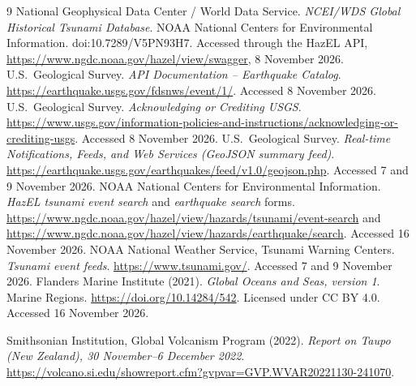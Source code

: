 \documentclass[a4paper,11pt,oneside]{book}
\begin{document}
\begin{thebibliography}{9}
 National Geophysical Data Center / World Data Service. \emph{NCEI/WDS Global Historical Tsunami Database}. NOAA National Centers for Environmental Information. doi:10.7289/V5PN93H7. Accessed through the HazEL API, \url{https://www.ngdc.noaa.gov/hazel/view/swagger}, 8 November 2026.
 U.S.\ Geological Survey. \emph{API Documentation -- Earthquake Catalog}. \url{https://earthquake.usgs.gov/fdsnws/event/1/}. Accessed 8 November 2026.
 U.S.\ Geological Survey. \emph{Acknowledging or Crediting USGS}. \url{https://www.usgs.gov/information-policies-and-instructions/acknowledging-or-crediting-usgs}. Accessed 8 November 2026.
 U.S.\ Geological Survey. \emph{Real-time Notifications, Feeds, and Web Services (GeoJSON summary feed)}. \url{https://earthquake.usgs.gov/earthquakes/feed/v1.0/geojson.php}. Accessed 7 and 9 November 2026.
 NOAA National Centers for Environmental Information. \emph{HazEL tsunami event search} and \emph{earthquake search} forms. \url{https://www.ngdc.noaa.gov/hazel/view/hazards/tsunami/event-search} and \url{https://www.ngdc.noaa.gov/hazel/view/hazards/earthquake/search}. Accessed 16 November 2026.
 NOAA National Weather Service, Tsunami Warning Centers. \emph{Tsunami event feeds}. \url{https://www.tsunami.gov/}. Accessed 7 and 9 November 2026.
Flanders Marine Institute (2021).
\emph{Global Oceans and Seas, version 1}.
Marine Regions.
\url{https://doi.org/10.14284/542}.
Licensed under CC BY 4.0.
Accessed 16 November 2026.

Smithsonian Institution, Global Volcanism Program (2022).
\emph{Report on Taupo (New Zealand),
30 November--6 December 2022}.
\url{https://volcano.si.edu/showreport.cfm?gvpvar=GVP.WVAR20221130-241070}.


\end{thebibliography}
\end{document}
